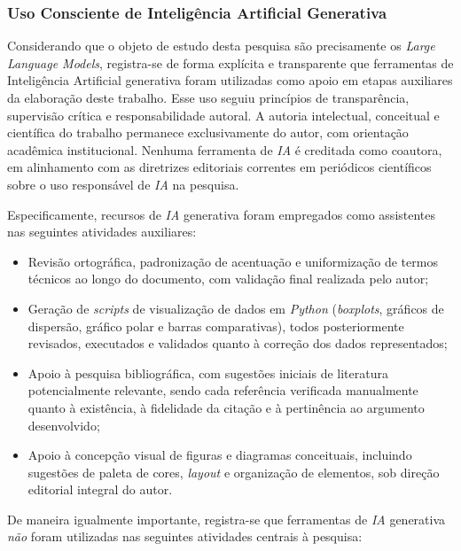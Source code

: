 \documentclass[12pt, a4paper]{article}
\numberwithin{equation}{section}
\begin{document}
\subsubsection{Uso Consciente de Inteligência Artificial Generativa}
\label{subsec:uso_consciente_ia}

Considerando que o objeto de estudo desta pesquisa são precisamente os \textit{Large Language Models}, registra-se de forma explícita e transparente que ferramentas de Inteligência Artificial generativa foram utilizadas como apoio em etapas auxiliares da elaboração deste trabalho. Esse uso seguiu princípios de transparência, supervisão crítica e responsabilidade autoral. A autoria intelectual, conceitual e científica do trabalho permanece exclusivamente do autor, com orientação acadêmica institucional. Nenhuma ferramenta de \textit{IA} é creditada como coautora, em alinhamento com as diretrizes editoriais correntes em periódicos científicos sobre o uso responsável de \textit{IA} na pesquisa.

Especificamente, recursos de \textit{IA} generativa foram empregados como assistentes nas seguintes atividades auxiliares: 

\begin{itemize}
\item Revisão ortográfica, padronização de acentuação e uniformização de termos técnicos ao longo do documento, com validação final realizada pelo autor; 

\item Geração de \textit{scripts} de visualização de dados em \textit{Python} (\textit{boxplots}, gráficos de dispersão, gráfico polar e barras comparativas), todos posteriormente revisados, executados e validados quanto à correção dos dados representados;

\item Apoio à pesquisa bibliográfica, com sugestões iniciais de literatura potencialmente relevante, sendo cada referência verificada manualmente quanto à existência, à fidelidade da citação e à pertinência ao argumento desenvolvido;

\item Apoio à concepção visual de figuras e diagramas conceituais, incluindo sugestões de paleta de cores, \textit{layout} e organização de elementos, sob direção editorial integral do autor.
\end{itemize}

De maneira igualmente importante, registra-se que ferramentas de \textit{IA} generativa \textit{não} foram utilizadas nas seguintes atividades centrais à pesquisa:
\end{document}
